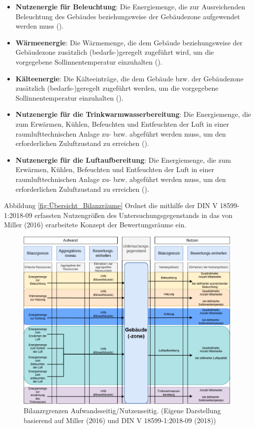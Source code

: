 \begin{itemize}
    \item \textbf{Nutzenergie für Beleuchtung}: Die Energiemenge, die zur Ausreichenden Beleuchtung des Gebäudes beziehungsweise der Gebäudezone aufgewendet werden muss (\cite[Kapitel 5.3.1]{DIN18599.2018}).
    \item \textbf{Wärmeenergie}: Die Wärmemenge, die dem Gebäude beziehungsweise der Gebäudezone zusätzlich (bedarfs-)geregelt zugeführt wird, um die vorgegebene Sollinnentemperatur einzuhalten (\cite[Kapitel 5.3.1]{DIN18599.2018}).
    \item \textbf{Kälteenergie}: Die Kälteeinträge, die dem Gebäude bzw. der Gebäudezone zusätzlich (bedarfs-)geregelt zugeführt werden, um die vorgegebene Sollinnentemperatur einzuhalten (\cite[Kapitel 5.3.1]{DIN18599.2018}).
    \item \textbf{Nutzenergie für die Trinkwarmwasserbereitung}: Die Energiemenge, die zum Erwärmen, Kühlen, Befeuchten und Entfeuchten der Luft in einer raumlufttechnischen Anlage zu- bzw. abgeführt werden muss, um den erforderlichen Zuluftzustand zu erreichen (\cite[Kapitel 5.3.1]{DIN18599.2018}).
    \item \textbf{Nutzenergie für die Luftaufbereitung}: Die Energiemenge, die zum Erwärmen, Kühlen, Befeuchten und Entfeuchten der Luft in einer raumlufttechnischen Anlage zu- bzw. abgeführt werden muss, um den erforderlichen Zuluftzustand zu erreichen (\cite[Kapitel 5.3.1]{DIN18599.2018}).
\end{itemize}

Abbildung \eqref{fig:Übersicht_Bilanzräume} Ordnet die mithilfe der DIN V 18599-1:2018-09 erfassten Nutzengrößen des Untersuchungsgegenstands
in das von Miller (2016) erarbeitete Konzept der Bewertungsräume ein.

\begin{figure}[H]
    \centering
    \includegraphics[width=1\textwidth]{../../Ressourcen/Abbildungen/Nutzengröße_Bewertungseinheit.png}
    \caption{Bilanzrgrenzen Aufwandsseitig/Nutzenseitig. (Eigene Darstellung basierend auf Miller (2016) und DIN V 18599-1:2018-09 (2018))}
    \label{fig:Übersicht_Bilanzräume}
\end{figure}

